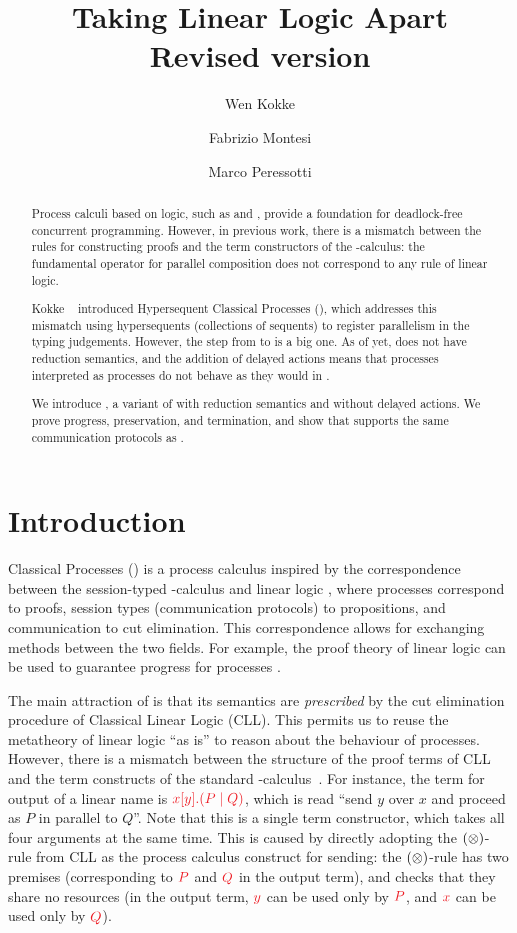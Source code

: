 \documentclass[copyright,creativecommons]{eptcs}
\title{Taking Linear Logic Apart\\{\large Revised version}}
\author{%
  Wen Kokke
  \institute{University of Edinburgh\\ Edinburgh, Scotland}
  \email{wen.kokke@ed.ac.uk}
  \and
  Fabrizio Montesi
  \institute{University of Southern Denmark\\ Odense, Denmark}
  \email{fmontesi@imada.sdu.dk}
  \and
  Marco Peressotti
  \institute{University of Southern Denmark\\ Odense, Denmark}
  \email{peressotti@imada.sdu.dk}}
\begin{document}
\maketitle

\begin{abstract}
  Process calculi based on logic, such as \piDILL and \cp, provide a foundation for deadlock-free concurrent programming. However, in previous work, there is a mismatch between the rules for constructing proofs and the term constructors of the \textpi-calculus: the fundamental operator for parallel composition does not correspond to any rule of linear logic.

  Kokke \etal~\cite{kokke2019} introduced Hypersequent Classical Processes (\dhcp), which addresses this mismatch using hypersequents (collections of sequents) to register parallelism in the typing judgements.
  However, the step from \cp to \dhcp is a big one. As of yet, \dhcp does not have reduction semantics, and the addition of delayed actions means that \cp processes interpreted as \dhcp processes do not behave as they would in \cp.

  We introduce \hcp, a variant of \dhcp with reduction semantics and without delayed actions. We prove progress, preservation, and termination, and show that \hcp supports the same communication protocols as \cp.
\end{abstract}

\section{Introduction}
\label{sec:introduction}

Classical Processes (\cp) \cite{wadler2012} is a process calculus inspired by the correspondence between the session-typed \textpi-calculus and linear logic \cite{caires2010}, where processes correspond to proofs, session types (communication protocols) to propositions, and communication to cut elimination. This correspondence allows for exchanging methods between the two fields. For example, the proof theory of linear logic can be used to guarantee progress for processes \cite{caires2010,wadler2012}.

The main attraction of \cp is that its semantics are \emph{prescribed} by the cut elimination procedure of Classical Linear Logic (CLL). This permits us to reuse the metatheory of linear logic ``as is'' to reason about the behaviour of processes. However, there is a mismatch between the structure of the proof terms of CLL and the term constructs of the standard \textpi-calculus~\cite{milner1992a,milner1992b}. For instance, the term for output of a linear name is $\tm{\cpSend{x}{y}{P}{Q}}$, which is read ``send $y$ over $x$ and proceed as $P$ in parallel to $Q$''. Note that this is a single term constructor, which takes all four arguments at the same time. This is caused by directly adopting the $(\otimes)$-rule from CLL as the process calculus construct for sending: the $(\otimes)$-rule has two premises (corresponding to $\tm P$ and $\tm Q$ in the output term), and checks that they share no resources (in the output term, $\tm y$ can be used only by $\tm P$, and $\tm x$ can be used only by $\tm Q$).
\end{document}
